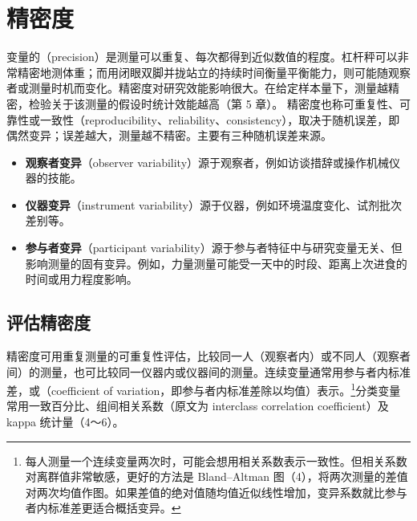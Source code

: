 \section{精密度}
变量的（precision）是测量可以重复、每次都得到近似数值的程度。杠杆秤可以非常精密地测体重；而用闭眼双脚并拢站立的持续时间衡量平衡能力，则可能随观察者或测量时机而变化。精密度对研究效能影响很大。在给定样本量下，测量越精密，检验关于该测量的假设时统计效能越高（第 5 章）。
精密度也称可重复性、可靠性或一致性（reproducibility、reliability、consistency），取决于随机误差，即偶然变异；误差越大，测量越不精密。主要有三种随机误差来源。
\begin{itemize}
\item \textbf{观察者变异}（observer variability）源于观察者，例如访谈措辞或操作机械仪器的技能。
\item \textbf{仪器变异}（instrument variability）源于仪器，例如环境温度变化、试剂批次差别等。
\item \textbf{参与者变异}（participant variability）源于参与者特征中与研究变量无关、但影响测量的固有变异。例如，力量测量可能受一天中的时段、距离上次进食的时间或用力程度影响。
\end{itemize}

\subsection{评估精密度}
精密度可用重复测量的可重复性评估，比较同一人（观察者内）或不同人（观察者间）的测量，也可比较同一仪器内或仪器间的测量。连续变量通常用参与者内标准差，或（coefficient of variation，即参与者内标准差除以均值）表示。\footnote{每人测量一个连续变量两次时，可能会想用相关系数表示一致性。但相关系数对离群值非常敏感，更好的方法是 Bland–Altman 图（4），将两次测量的差值对两次均值作图。如果差值的绝对值随均值近似线性增加，变异系数就比参与者内标准差更适合概括变异。}分类变量常用一致百分比、组间相关系数（原文为 interclass correlation coefficient）及 kappa 统计量（4～6）。

